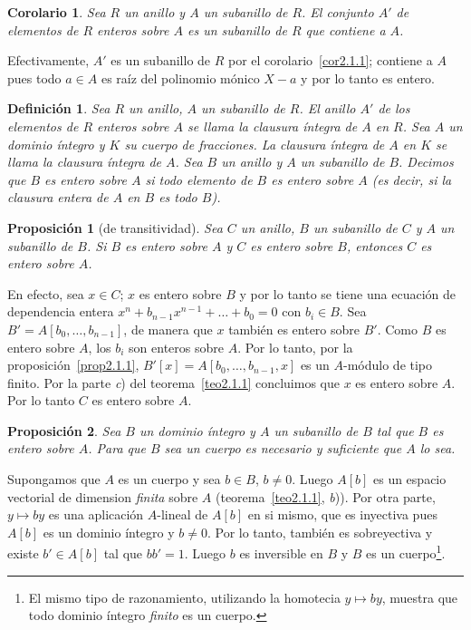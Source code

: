 \documentclass[bibtotoc,leqno,spanish]{amsbook}
\numberwithin{equation}{section}
\theoremstyle{note}
\newtheorem{definition}{Definici\'on}
\theoremstyle{note}
\newtheorem{proposition}{Proposici\'on}
\newtheorem{corollary}{Corolario}
\theoremstyle{rem}
\numberwithin{theorem}{section}
\numberwithin{proposition}{section}
\numberwithin{definition}{section}
\numberwithin{lemma}{section}
\numberwithin{corollary}{section}
\numberwithin{example}{section}
\numberwithin{footnote}{section}%
\begin{document}
\begin{corollary}\label{cor2.1.2}
Sea $R$ un anillo y $A$ un subanillo de $R$. El conjunto $A'$ de elementos de $R$ enteros sobre $A$
es un subanillo de $R$ que contiene a $A$.
\end{corollary}

Efectivamente, $A'$ es un subanillo de $R$ por el corolario~\ref{cor2.1.1}; contiene a $A$ pues todo $a\in A$ es
ra\'iz del polinomio m\'onico $X-a$ y por lo tanto es entero.

\begin{definition}
Sea $R$ un anillo, $A$ un subanillo de $R$. El anillo $A'$ de los elementos de $R$ enteros sobre $A$ se
llama la \emph{clausura \'integra} de $A$ en $R$. Sea $A$ un dominio \'integro y $K$ su cuerpo de fracciones. La clausura
\'integra de $A$ en $K$ se llama la clausura \'integra de $A$.
Sea $B$ un anillo y $A$ un subanillo de $B$. Decimos
que $B$ es \emph{entero} sobre $A$ si todo elemento de $B$ es entero sobre $A$ (es decir, si la clausura
entera de $A$ en $B$ es todo $B$).
\end{definition}

\begin{proposition}[de transitividad]\label{prop2.1.2}
Sea $C$ un anillo, $B$ un subanillo de $C$ y $A$ un subanillo de $B$. Si $B$ es entero sobre $A$ y $C$ es
entero sobre $B$, entonces $C$ es entero sobre $A$.
\end{proposition}

En efecto, sea $x\in C$; $x$ es entero sobre $B$ y por lo tanto se tiene una ecuaci\'on de dependencia entera
$x^{n}+b_{n-1}x^{n-1}+\dots+b_{0} = 0$ con $b_{i}\in B$. Sea $B' = A[b_{0},\dots,b_{n-1}]$, de manera que $x$
tambi\'en es entero sobre $B'$. Como $B$ es entero sobre $A$, los $b_{i}$ son enteros sobre
$A$. Por lo tanto, por la proposici\'on~\ref{prop2.1.1},
$B'[x] = A[b_{0},\dots,b_{n-1},x]$ es un $A$-m\'odulo de tipo finito. Por la parte
{\itshape c}) del teorema~\ref{teo2.1.1}
concluimos que $x$ es entero sobre $A$. Por lo tanto $C$ es entero sobre $A$.

\begin{proposition}\label{prop2.1.3}
Sea $B$ un dominio \'integro y $A$ un subanillo de $B$ tal que $B$ es entero sobre $A$. Para que $B$ sea
un cuerpo es necesario y suficiente que $A$ lo sea.
\end{proposition}

Supongamos que $A$ es un cuerpo y sea $b\in B$, $b\neq 0$. Luego $A[b]$ es un espacio vectorial de
dimension {\em finita} sobre $A$ (teorema~\ref{teo2.1.1}, {\itshape b})).
Por otra parte, $y\mapsto by$ es una aplicaci\'on
$A$-lineal de $A[b]$ en si mismo, que es inyectiva pues $A[b]$ es un dominio \'integro y $b\neq 0$. Por
lo tanto, tambi\'en es sobreyectiva y existe $b'\in A[b]$ tal que $bb' =1$. Luego $b$ es inversible en $B$
y $B$ es un cuerpo\footnote{El mismo tipo de razonamiento, utilizando la homotecia $y\mapsto by$, muestra
que todo dominio \'integro {\em finito} es un cuerpo.}.
\end{document}
